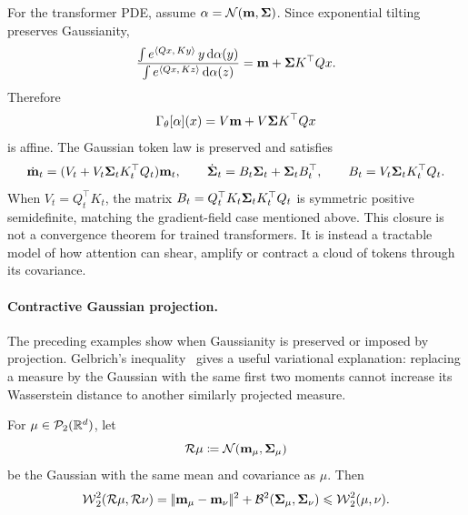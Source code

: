 \begin{example}
	For the transformer PDE, assume $\alpha=\mathcal{N}(\mathbf{m},\mathbf{\Sigma})$. Since exponential tilting preserves Gaussianity,
	\[
		\frac{\int e^{\langle Qx,\,Ky\rangle}\,y\,\mathrm{d}\alpha(y)}
		     {\int e^{\langle Qx,\,Kz\rangle}\,\mathrm{d}\alpha(z)}
		=
		\mathbf{m}+\mathbf{\Sigma} K^\top Qx.
	\]
	Therefore
	\[
		\Gamma_\theta[\alpha](x)=V\mathbf{m}+V\mathbf{\Sigma} K^\top Qx
	\]
	is affine. The Gaussian token law is preserved and satisfies
	\[
		\dot{\mathbf{m}}_t=(V_t+V_t\mathbf{\Sigma}_tK_t^\top Q_t)\mathbf{m}_t,
		\qquad
		\dot{\mathbf{\Sigma}}_t=B_t\mathbf{\Sigma}_t+\mathbf{\Sigma}_tB_t^\top,
		\qquad
		B_t=V_t\mathbf{\Sigma}_tK_t^\top Q_t.
	\]
	When $V_t=Q_t^\top K_t$, the matrix $B_t=Q_t^\top K_t\mathbf{\Sigma}_tK_t^\top Q_t$ is symmetric positive semidefinite, matching the gradient-field case mentioned above.
	This closure is not a convergence theorem for trained transformers. It is instead a tractable model of how attention can shear, amplify or contract a cloud of tokens through its covariance.
\end{example}

\paragraph{Contractive Gaussian projection.}

The preceding examples show when Gaussianity is preserved or imposed by projection. Gelbrich's inequality~\cite{gelbrich1990formula} gives a useful variational explanation: replacing a measure by the Gaussian with the same first two moments cannot increase its Wasserstein distance to another similarly projected measure.

\begin{thm}\label{thm-gelbrich-projection}
	For $\mu\in\mathcal{P}_2(\mathbb{R}^d)$, let
	\[
		\mathcal R\mu\coloneqq \mathcal{N}(\mathbf{m}_\mu,\mathbf{\Sigma}_\mu)
	\]
	be the Gaussian with the same mean and covariance as $\mu$. Then
	\[
		\operatorname{\mathcal{W}}_2^2(\mathcal R\mu,\mathcal R\nu)
		=
		|\!| \mathbf{m}_\mu-\mathbf{m}_\nu |\!|^2+\mathcal{B}^2(\mathbf{\Sigma}_\mu,\mathbf{\Sigma}_\nu)
		\leqslant
		\operatorname{\mathcal{W}}_2^2(\mu,\nu).
	\]
\end{thm}

